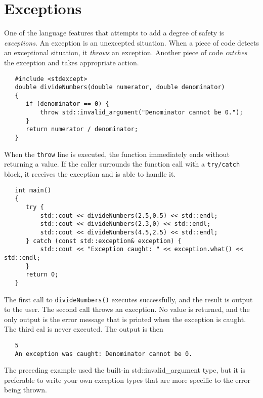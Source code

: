\documentclass{article}
\begin{document}
\section{Exceptions}
One of the language features that attempts to add a degree of safety is \textit{exceptions}. An
exception is an unexcepted situation. When a piece of code detects an exceptional situation, it
\textit{throws} an exception. Another piece of code \textit{catches} the exception and takes appropriate
action.
\begin{verbatim}
   #include <stdexcept>
   double divideNumbers(double numerator, double denominator) 
   {
      if (denominator == 0) {
          throw std::invalid_argument("Denominator cannot be 0.");
      }
      return numerator / denominator;
   }
\end{verbatim}
When the \texttt{throw} line is executed, the function immediately ends without returning a value.
If the caller surrounds the function call with a \texttt{try/catch} block, it receives the exception
and is able to handle it.
\begin{verbatim}
   int main()
   {
      try {
          std::cout << divideNumbers(2.5,0.5) << std::endl;
          std::cout << divideNumbers(2.3,0) << std::endl;
          std::cout << divideNumbers(4.5,2.5) << std::endl;
      } catch (const std::exception& exception) {
          std::cout << "Exception caught: " << exception.what() << std::endl;
      }
      return 0;
   }
\end{verbatim}
The first call to \texttt{divideNumbers()} executes successfully, and the result is output to the user.
The second call throws an execption. No value is returned, and the only output is the error message
that is printed when the exception is caught. The third cal is never executed. The output is then
\begin{verbatim}
   5
   An exception was caught: Denominator cannot be 0.
\end{verbatim}
The preceding example used the built-in std::invalid\_argument type, but it is preferable to write
your own exception types that are more specific to the error being thrown.
\end{document}
